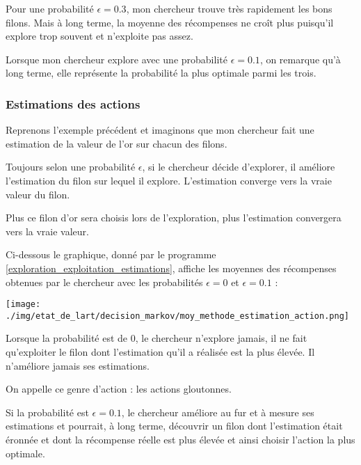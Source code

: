 \documentclass[
12pt,
french,
]{article}
\let\origfigure\figure
\let\endorigfigure\endfigure
\renewenvironment{figure}[1][2] {
  \expandafter\origfigure\expandafter[H]
} {
  \endorigfigure
}
\begin{document}
Pour une probabilité \(\epsilon = 0.3\), mon chercheur trouve très
rapidement les bons filons. Mais à long terme, la moyenne des
récompenses ne croît plus puisqu'il explore trop souvent et n'exploite
pas assez.

Lorsque mon chercheur explore avec une probabilité \(\epsilon = 0.1\),
on remarque qu'à long terme, elle représente la probabilité la plus
optimale parmi les trois.

\hypertarget{estimations-des-actions}{%
\subsubsection{Estimations des actions}\label{estimations-des-actions}}

Reprenons l'exemple précédent et imaginons que mon chercheur fait une
estimation de la valeur de l'or sur chacun des filons.

Toujours selon une probabilité \(\epsilon\), si le chercheur décide
d'explorer, il améliore l'estimation du filon sur lequel il explore.
L'estimation converge vers la vraie valeur du filon.

Plus ce filon d'or sera choisis lors de l'exploration, plus l'estimation
convergera vers la vraie valeur.

Ci-dessous le graphique, donné par le programme
\ref{exploration_exploitation_estimations}, affiche les moyennes des
récompenses obtenues par le chercheur avec les probabilités
\(\epsilon = 0\) et \(\epsilon = 0.1\) :

\begin{figure}
\centering
\texttt{[image: ./img/etat\_de\_lart/decision\_markov/moy\_methode\_estimation\_action.png]}
\caption{Graphique de moyennes des récompenses perçues en fonction
d'Epsilon avec la méthode d'estimation d'action}
\end{figure}

Lorsque la probabilité est de \(0\), le chercheur n'explore jamais, il
ne fait qu'exploiter le filon dont l'estimation qu'il a réalisée est la
plus élevée. Il n'améliore jamais ses estimations.

On appelle ce genre d'action : les actions gloutonnes.

Si la probabilité est \(\epsilon = 0.1\), le chercheur améliore au fur
et à mesure ses estimations et pourrait, à long terme, découvrir un
filon dont l'estimation était éronnée et dont la récompense réelle est
plus élevée et ainsi choisir l'action la plus optimale.
\end{document}
